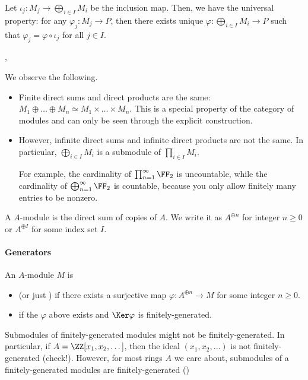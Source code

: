 Let $\iota_j : M_j\to\bigoplus_{i\in I}  M_i$
be the inclusion map. 
Then, we have the universal property:
for any $\varphi_j : M_j\to P$,
then there exists unique $\varphi : \bigoplus_{i\in I} M_i\to P$
such that $\varphi_j = \varphi\circ \iota_j$ for all $j\in I$.
\begin{center}
,
\end{center}
We observe the following.
\begin{itemize}
\item Finite direct sums and direct products are the same: 
$M_1\oplus \dots\oplus M_n\simeq M_1\times \dots\times M_n$.
This is a special property of the category of modules
and can only be seen through the explicit construction.
\item However, infinite direct sums and infinite direct products 
are not the same. In particular, $\bigoplus_{i\in I}M_i$ 
is a submodule of $\prod_{i\in I}M_i$.

For example, the cardinality of $\prod_{n=1}^\infty \FF_2$ 
is uncountable, while the cardinality of $\bigoplus_{n=1}^\infty \FF_2$ 
is countable, because you only allow finitely many entries 
to be nonzero.
\end{itemize}
A  $A$-module is the direct sum of
copies of $A$. We write it as $A^{\oplus n}$
for integer $n\geq 0$ 
or $A^{\oplus I}$ for some index set $I$.

\paragraph{Generators}
An $A$-module $M$ is
\begin{itemize}
    \item {}
    (or just ) if 
    there exists a surjective map $\varphi : A^{\oplus n}\to M$
    for some integer $n\geq 0$.
    \item {} if 
    the $\varphi$ above exists and $\Ker\varphi$ is finitely-generated.
\end{itemize}
\begin{warn}
Submodules of finitely-generated modules might not 
be finitely-generated. In particular, if $A=\ZZ[x_1,x_2,\dots]$,
then the ideal $(x_1,x_2,\dots)$ is not finitely-generated 
(check!). However, for most rings $A$ we care about,
submodules of a finitely-generated modules are 
finitely-generated ()
\end{warn}
%
%
%
%
